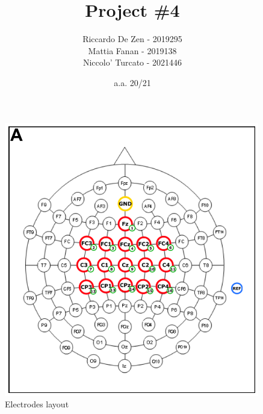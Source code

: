 \documentclass[11pt]{article}
\title{Project \#4}
\author{Riccardo De Zen - 2019295 \\ Mattia Fanan - 2019138 \\ Niccolo' Turcato - 2021446}
\date{a.a. 20/21}
\begin{document}
\maketitle
\tableofcontents

\newpage


\begin{figure}[h!]
  \includegraphics[width=0.4\linewidth]{electrodes_layout.PNG}
  \caption{Electrodes layout}
  \label{fig:electrodes_layout}
\end{figure}

\end{document}
